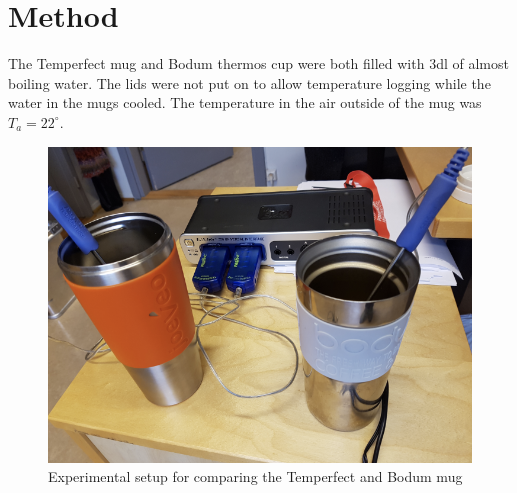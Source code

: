 \documentclass[reprint,english,notitlepage]{revtex4-2}
\begin{document}
\section{Method}
The Temperfect mug and Bodum thermos cup were both filled with 3dl of almost boiling water. The lids were not put on to allow temperature logging while the water in the mugs cooled. The temperature in the air outside of the mug was $T_a = 22^{\circ}$.
\begin{figure}[!htb]
  \includegraphics[scale=0.5]{setup.png}
  \caption{Experimental setup for comparing the Temperfect and Bodum mug}\label{fig:setup}
\end{figure}
\FloatBarrier
\end{document}
